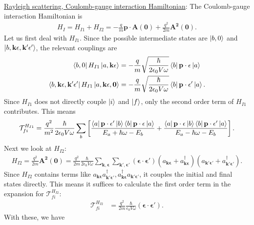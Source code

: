 \documentclass{article}
\theoremstyle{definition}
\newcommand{\f}[2]{\frac{#1}{#2}}
\newcommand{\lb}{\left[}
\newcommand{\rb}{\right]}
\begin{document}
\begin{enumerate}[label=(\alph*)]
\noindent \underline{Rayleigh scattering, Coulomb-gauge interaction Hamiltonian}:  The Coulomb-gauge interaction Hamiltonian is 
\begin{align*}
H_I =  H_{I1} + H_{I2}  = - \f{q}{m} \mathbf{p}\cdot \mathbf{A(0)} + \f{q^2}{ 2m } \mathbf{A^2(0)}.
\end{align*}
Let us first deal with $H_{I1}$. Since the possible intermediate states are $\ket{b,0}$ and $\ket{b,\mathbf{k\epsilon, k'\epsilon'}}$, the relevant couplings are
\begin{align*}
\bra{b,0} H_{I1} \ket{a, \mathbf{k\epsilon}} 
&= -\f{q}{m} \sqrt{\f{\hbar}{2\epsilon_0 V \omega}}  \bra{b}  \mathbf{p} \cdot \mathbf{\epsilon}   \ket{a} \\ 
\bra{b, \mathbf{k\epsilon,k'\epsilon'}} H_{I1} \ket{a, \mathbf{k\epsilon,0}}
&= -\f{q}{m} \sqrt{\f{\hbar}{2\epsilon_0 V \omega}} \bra{b}  \mathbf{p}\cdot \mathbf{\epsilon'}  \ket{a}.
 \end{align*}
Since $H_{I1}$ does not directly couple $\ket{i}$ and $\ket{f}$, only the second order term of $H_{I1}$ contributes. This means
 \begin{align*}
 \mathcal{T}_{fi}^{H_{I1}} = \f{q^2}{m^2} \f{\hbar }{2\epsilon_0 V \omega} 
 \sum_b
 \lb 
 \f{\bra{a} \mathbf{p}\cdot \mathbf{\epsilon'}  \ket{b} \bra{b}  \mathbf{p}\cdot \mathbf{\epsilon} \ket{a}}{E_a + \hbar \omega - E_b}
 +
 \f{\bra{a}  \mathbf{p}\cdot \mathbf{\epsilon} \ket{b}\bra{b}  \mathbf{p}\cdot \mathbf{\epsilon'}  \ket{a}}{E_a - \hbar \omega - E_b}
 \rb.
 \end{align*}
Next we look at $H_{I2}$:
\begin{align*}
H_{I2} = \f{q^2}{2m} \mathbf{A^2(0)} = \f{q^2}{2m} \f{\hbar}{2\epsilon_0 V \omega} \sum_{\mathbf{k,\epsilon}}\sum_{\mathbf{k',\epsilon'}} 
(\mathbf{\epsilon}\cdot \mathbf{\epsilon'}) 
(a_{\mathbf{k\epsilon}} + a^\dagger_{\mathbf{k\epsilon}})
(a_{\mathbf{k'\epsilon'}} + a^\dagger_{\mathbf{k'\epsilon'}}).
\end{align*}
Since $H_{I2}$ contains terms like $a_\mathbf{k\epsilon} a^\dagger_{\mathbf{k'\epsilon'}}, a^\dagger_{\mathbf{k\epsilon}} a_\mathbf{k'\epsilon'}$,  it couples the initial and final states directly. This means it suffices to calculate the first order term in the expansion for $\mathcal{T}_{fi}^{H_{I2}}$:
\begin{align*}
\mathcal{T}_{fi}^{H_{I2}} 
&= \f{q^2}{2m} \f{\hbar }{\epsilon_0 V \omega}(\mathbf{\epsilon} \cdot \mathbf{\epsilon'}).
\end{align*}
With these, we have
\begin{align*}

\end{align*}
\end{enumerate}
\end{document}

